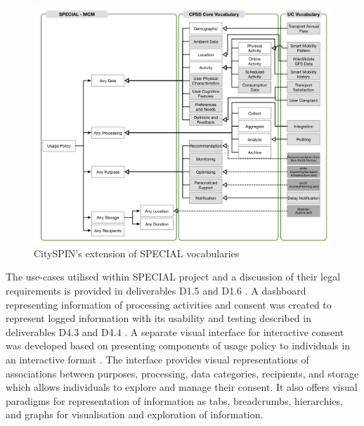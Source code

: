 \begin{figure}[htbp]
    \centering
    \includegraphics[width=0.8\linewidth]{img/SPECIAL_CitySPIN.png}
    \caption{CitySPIN's extension of SPECIAL vocabularies \cite{fernandez_user_2019}}
    \label{fig:SPECIAL-CitySPIN}
\end{figure}

The use-cases utilised within SPECIAL project and a discussion of their legal requirements is provided in deliverables D1.5 \cite{bonatti_d1.5_2018} and D1.6 \cite{schlehahn_d1.6_2018}. A dashboard representing information of processing activities and consent was created to represent logged information \cite{raschke_designing_2017} with its usability and testing described in deliverables D4.3 \cite{raschke_d4.3_2019} and D4.4 \cite{milosevic_d4.4_2019}. A separate visual interface for interactive consent was developed based on presenting components of usage policy to individuals in an interactive format \cite{gritzalis_i_2019}. The interface provides visual representations of associations between purposes, processing, data categories, recipients, and storage which allows individuals to explore and manage their consent. It also offers visual paradigms for representation of information as tabs, breadcrumbs, hierarchies, and graphs for visualisation and exploration of information. 

